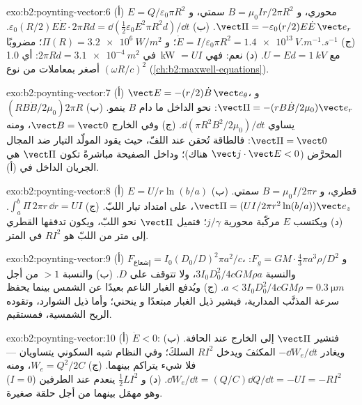 \begin{solution}{exo:b2:poynting-vector:6}
(أ) $E = Q/\varepsilon_0\pi R^2$ محوري، و $B = \mu_0Ir/2\pi R^2$ سمتي، و $\vect\Pi = -\varepsilon_0
(r/2)E\dot E\,\vect e_r$. (ب) $\varepsilon_0(R/2)E\dot E\cdot2\pi Rd = \dd(\tfrac12\varepsilon_0E^2\pi R^2d)/
\dd t$. (ج) $\dot E = I/\varepsilon_0\pi R^2 = \qty{1.4e13}{V.m^{-1}.s^{-1}}$؛ و $\Pi(R) = \qty{3.2e6}{W/m^2}$؛
مضروبًا في $2\pi Rd = \qty{3.1e-4}{m^2}$: أي \qty{1.0}{kW} $= UI$ مع $U = Ed = \qty{1}{kV}$. (د)
نعم: فهي أصغر بمعاملات من نوع $(\omega R/c)^2$ (\cref{ch:b2:maxwell-equations}).
\end{solution}

\begin{solution}{exo:b2:poynting-vector:7}
(أ) $\vect E = -(r/2)\dot B\,\vect e_\theta$، و $\vect\Pi = -(rB\dot B/2\mu_0)\vect e_r$: نحو الداخل
ما دام $B$ ينمو. (ب) $(RB\dot B/2\mu_0)2\pi R$ يساوي $\dd(\pi R^2B^2/2\mu_0)/\dd t$. (ج)
وفي الخارج $\vect B = \vect 0$، ومنه $\vect\Pi = \vect 0$: فالطاقة تُحقن عند اللفّ،
حيث يقود المولّد التيار ضد المجال المحرَّض ($\vect j\cdot\vect E < 0$ هناك)؛ وداخل الصفيحة مباشرةً
تكون $\vect\Pi$ هي الجريان الداخل في (أ).
\end{solution}

\begin{solution}{exo:b2:poynting-vector:8}
(أ) $E = U/r\ln(b/a)$ قطري، و $B = \mu_0I/2\pi r$ سمتي. (ب) $\vect\Pi = (UI/
2\pi r^2\ln(b/a))\vect e_z$، على امتداد تيار اللبّ. (ج) $\int_a^b\Pi\,2\pi r\,\dd r =
UI$. (د) ويكتسب $E$ مركّبة محورية $j/\gamma$؛ فتميل $\vect\Pi$ نحو
اللبّ، ويكون تدفقها القطري إلى متر من اللبّ هو $RI^2$ في المتر.
\end{solution}

\begin{solution}{exo:b2:poynting-vector:9}
(أ) $F_{\text{إشعاع}} = I_0(D_0/D)^2\pi a^2/c$، و $F_g = GM\cdot\tfrac43\pi a^3\rho/D^2$: والنسبة
$3I_0D_0^2/4cGM\rho a$، ولا تتوقف على $D$. (ب) والنسبة $> 1$ من أجل $a < 3I_0D_0^2/
4cGM\rho = \qty{0.3}{\micro m}$. (ج) ويُدفع الغبار الناعم بعيدًا عن الشمس بينما
يحفظ سرعة المذنَّب المدارية، فيشير ذيل الغبار مبتعدًا و
ينحني؛ وأما ذيل الشوارد، وتقوده الريح الشمسية، فمستقيم.
\end{solution}

\begin{solution}{exo:b2:poynting-vector:10}
(أ) $\dot E < 0$: فتشير $\vect\Pi$ إلى الخارج عند الحافة. (ب) ويغادر $-\dd W_e/\dd t$
المكثفَ ويدخل $RI^2$ السلكَ؛ وفي النظام شبه السكوني
يتساويان --- فلا شيء يتراكم بينهما. (ج) $W_e =
Q^2/2C$، ومنه $\dd W_e/\dd t = (Q/C)\dd Q/\dd t = -UI = -RI^2$. (د) و $\tfrac12LI^2$
ينعدم عند الطرفين ($I = 0$) وهو مهمَل بينهما من أجل حلقة
صغيرة.
\end{solution}

